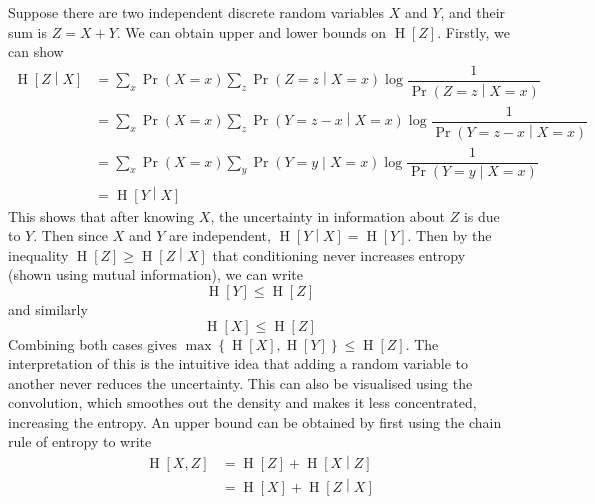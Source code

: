 \documentclass[11pt]{report} %
\begin{document}
Suppose there are two independent discrete random variables $X$ and $Y$, and their sum is $Z = X + Y$. We can obtain upper and lower bounds on $\operatorname{H}\left[Z\right]$. Firstly, we can show
\begin{align}
\operatorname{H}\left[Z\middle|X\right] &= \sum_{x}\operatorname{Pr}\left(X = x\right)\sum_{z}\operatorname{Pr}\left(Z = z\middle|X = x\right)\log\dfrac{1}{\operatorname{Pr}\left(Z = z\middle|X = x\right)} \\
&= \sum_{x}\operatorname{Pr}\left(X = x\right)\sum_{z}\operatorname{Pr}\left(Y = z - x\middle|X = x\right)\log\dfrac{1}{\operatorname{Pr}\left(Y = z - x\middle|X = x\right)} \\
&= \sum_{x}\operatorname{Pr}\left(X = x\right)\sum_{y}\operatorname{Pr}\left(Y = y\middle|X = x\right)\log\dfrac{1}{\operatorname{Pr}\left(Y = y\middle|X = x\right)} \\
&= \operatorname{H}\left[Y\middle|X\right]
\end{align}
This shows that after knowing $X$, the uncertainty in information about $Z$ is due to $Y$. Then since $X$ and $Y$ are independent, $\operatorname{H}\left[Y\middle|X\right] = \operatorname{H}\left[Y\right]$. Then by the inequality $\operatorname{H}\left[Z\right] \geq \operatorname{H}\left[Z\middle|X\right]$ that conditioning never increases entropy (shown using mutual information), we can write
\begin{equation}
\operatorname{H}\left[Y\right] \leq \operatorname{H}\left[Z\right]
\end{equation}
and similarly 
\begin{equation}
\operatorname{H}\left[X\right] \leq \operatorname{H}\left[Z\right]
\end{equation}
Combining both cases gives $\max\left\{\operatorname{H}\left[X\right], \operatorname{H}\left[Y\right]\right\} \leq \operatorname{H}\left[Z\right]$. The interpretation of this is the intuitive idea that adding a random variable to another never reduces the uncertainty. This can also be visualised using the convolution, which smoothes out the density and makes it less concentrated, increasing the entropy. An upper bound can be obtained by first using the chain rule of entropy to write
\begin{align}
\operatorname{H}\left[X, Z\right] &= \operatorname{H}\left[Z\right] + \operatorname{H}\left[X\middle|Z\right] \\
&= \operatorname{H}\left[X\right] + \operatorname{H}\left[Z\middle|X\right]
\end{align}
\end{document}
